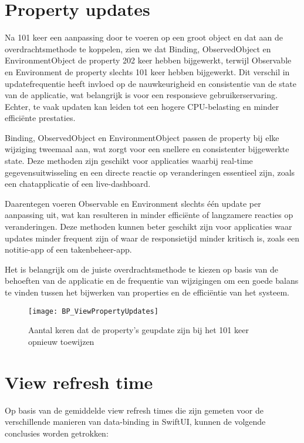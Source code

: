 \newpage
\section{Property updates}

Na 101 keer een aanpassing door te voeren op een groot object en dat aan de overdrachtsmethode te koppelen, zien we dat Binding, ObservedObject en EnvironmentObject de property 202 keer hebben bijgewerkt, terwijl Observable en Environment de property slechts 101 keer hebben bijgewerkt. Dit verschil in updatefrequentie heeft invloed op de nauwkeurigheid en consistentie van de state van de applicatie, wat belangrijk is voor een responsieve gebruikerservaring. Echter, te vaak updaten kan leiden tot een hogere CPU-belasting en minder efficiënte prestaties.

Binding, ObservedObject en EnvironmentObject passen de property bij elke wijziging tweemaal aan, wat zorgt voor een snellere en consistenter bijgewerkte state. Deze methoden zijn geschikt voor applicaties waarbij real-time gegevensuitwisseling en een directe reactie op veranderingen essentieel zijn, zoals een chatapplicatie of een live-dashboard.

Daarentegen voeren Observable en Environment slechts één update per aanpassing uit, wat kan resulteren in minder efficiënte of langzamere reacties op veranderingen. Deze methoden kunnen beter geschikt zijn voor applicaties waar updates minder frequent zijn of waar de responsietijd minder kritisch is, zoals een notitie-app of een takenbeheer-app.

Het is belangrijk om de juiste overdrachtsmethode te kiezen op basis van de behoeften van de applicatie en de frequentie van wijzigingen om een goede balans te vinden tussen het bijwerken van properties en de efficiëntie van het systeem.

\begin{figure}[htbp]
    \centering
    \texttt{[image: BP\_ViewPropertyUpdates]} 
    \caption{Aantal keren dat de property's geupdate zijn bij het 101 keer opnieuw toewijzen}
    \label{fig:propertyUpdates}
\end{figure}

\newpage
\section{View refresh time}
Op basis van de gemiddelde view refresh times die zijn gemeten voor de verschillende manieren van data-binding in SwiftUI, kunnen de volgende conclusies worden getrokken:

